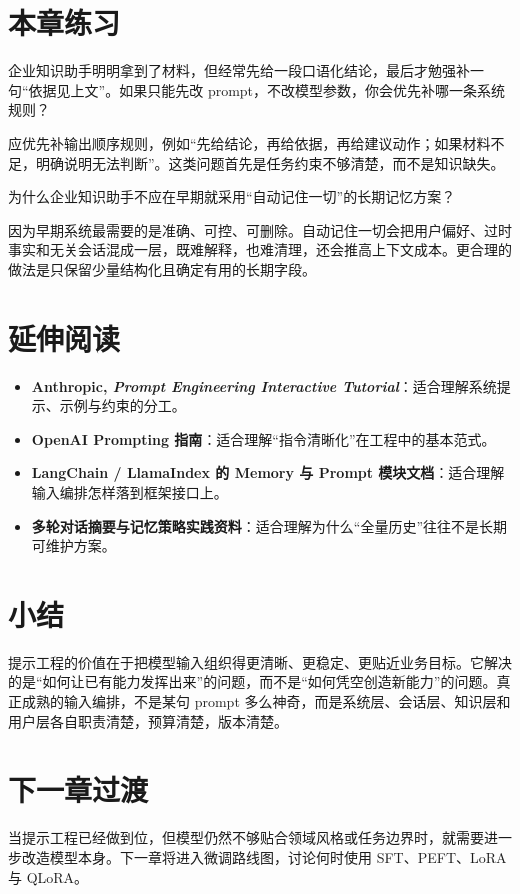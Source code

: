 \section{本章练习}
\begin{exercise}[提示修复]
企业知识助手明明拿到了材料，但经常先给一段口语化结论，最后才勉强补一句“依据见上文”。如果只能先改 prompt，不改模型参数，你会优先补哪一条系统规则？
\end{exercise}

\begin{solution}
应优先补{\heiti 输出顺序规则}，例如“先给结论，再给依据，再给建议动作；如果材料不足，明确说明无法判断”。这类问题首先是任务约束不够清楚，而不是知识缺失。
\end{solution}

\begin{exercise}[记忆设计]
为什么企业知识助手不应在早期就采用“自动记住一切”的长期记忆方案？
\end{exercise}

\begin{solution}
因为早期系统最需要的是{\heiti 准确、可控、可删除}。自动记住一切会把用户偏好、过时事实和无关会话混成一层，既难解释，也难清理，还会推高上下文成本。更合理的做法是只保留少量结构化且确定有用的长期字段。
\end{solution}

\section{延伸阅读}
\begin{itemize}
  \item \textbf{Anthropic, \emph{Prompt Engineering Interactive Tutorial}}：适合理解系统提示、示例与约束的分工。
  \item \textbf{OpenAI Prompting 指南}：适合理解“指令清晰化”在工程中的基本范式。
  \item \textbf{LangChain / LlamaIndex 的 Memory 与 Prompt 模块文档}：适合理解输入编排怎样落到框架接口上。
  \item \textbf{多轮对话摘要与记忆策略实践资料}：适合理解为什么“全量历史”往往不是长期可维护方案。
\end{itemize}

\section{小结}
提示工程的价值在于把模型输入组织得更清晰、更稳定、更贴近业务目标。它解决的是“如何让已有能力发挥出来”的问题，而不是“如何凭空创造新能力”的问题。真正成熟的输入编排，不是某句 prompt 多么神奇，而是系统层、会话层、知识层和用户层各自职责清楚，预算清楚，版本清楚。

\section{下一章过渡}
当提示工程已经做到位，但模型仍然不够贴合领域风格或任务边界时，就需要进一步改造模型本身。下一章将进入微调路线图，讨论何时使用 SFT、PEFT、LoRA 与 QLoRA。
